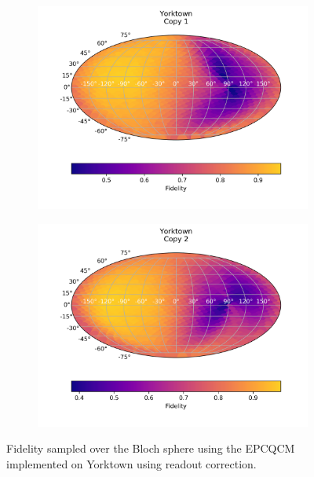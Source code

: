 \begin{figure}[H]
  \centering
  \begin{subfigure}{.5\textwidth}
    \centering
    \includegraphics[width=\textwidth]{Figures/Economical/IBM/FullSphere/results_corrected_ibmqx2_copy1.png}
    
    \label{fig:epc_corrected_yorktown_sphere_1}
  \end{subfigure}%
  \begin{subfigure}{.5\textwidth}
    \centering
    \includegraphics[width=\textwidth]{Figures/Economical/IBM/FullSphere/results_corrected_ibmqx2_copy2.png}
    
    \label{fig:epc_corrected_yorktown_sphere_2}
  \end{subfigure}
  \caption{Fidelity sampled over the Bloch sphere using the EPCQCM implemented on Yorktown using readout correction.}
  \label{fig:epc_corrected_yorktown_sphere}
\end{figure}

